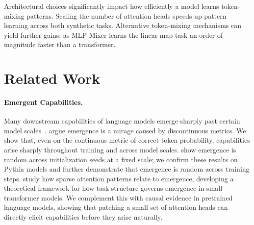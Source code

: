 \documentclass{article}
\begin{document}
\begin{takeaway}
Architectural choices significantly impact how efficiently a model learns token-mixing patterns. Scaling the number of attention heads speeds up pattern learning across both synthetic tasks. Alternative token-mixing mechanisms can yield further gains, as MLP-Mixer learns the linear map task an order of magnitude faster than a transformer.
\end{takeaway}


\section{Related Work}

\paragraph{Emergent Capabilities.}
Many downstream capabilities of language models emerge sharply past certain model scales~\citep{wei2022emergentabilitieslargelanguage}. \citet{schaeffer2023emergentabilitieslargelanguage} argue emergence is a mirage caused by discontinuous metrics. We show that, even on the continuous metric of correct-token probability, capabilities arise sharply throughout training and across model scales. \citet{zhao2026randomscalingemergentcapabilities} show emergence is random across initialization seeds at a fixed scale; we confirm these results on Pythia models and further demonstrate that emergence is random across training steps. \citet{zucchet2025emergencesparseattentionimpact} study how sparse attention patterns relate to emergence, developing a theoretical framework for how task structure governs emergence in small transformer models. We complement this with causal evidence in pretrained language models, showing that patching a small set of attention heads can directly elicit capabilities before they arise naturally.
\end{document}
